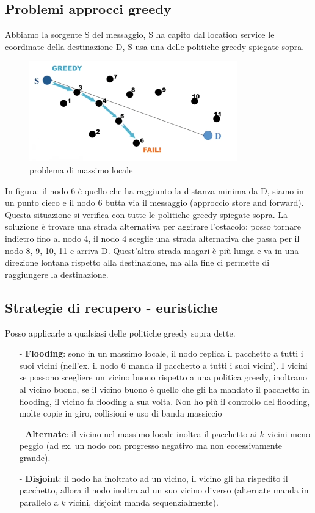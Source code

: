 \documentclass[12pt,italian]{report}
\begin{document}
\subsection{Problemi approcci greedy}
Abbiamo la sorgente S del messaggio, S ha capito dal location service le coordinate della destinazione D, S usa una delle politiche greedy spiegate sopra. 
\begin{figure}[h]
\centering
\includegraphics[width=90mm]{img/probgreed.PNG}
\caption{problema di massimo locale}
\label{fig:ferger}
\end{figure}

\noindent In figura: il nodo 6 è quello che ha raggiunto la distanza minima da D, siamo in un punto cieco e il nodo 6 butta via il messaggio (approccio store and forward). \\ Questa situazione si verifica con tutte le politiche greedy spiegate sopra. 
\bigbreak
La soluzione è trovare una strada alternativa per aggirare l'ostacolo: posso tornare indietro fino al nodo 4, il nodo 4 sceglie una strada alternativa che passa per il nodo 8, 9, 10, 11 e arriva D. Quest'altra strada magari è più lunga e va in una direzione lontana rispetto alla destinazione, ma alla fine ci permette di raggiungere la destinazione. 

\subsection{Strategie di recupero - euristiche}
Posso applicarle a qualsiasi delle politiche greedy sopra dette.
\begin{itemize}
    \item [-] \textbf{Flooding}: sono in un massimo locale, il nodo replica il pacchetto a tutti i suoi vicini (nell'ex. il nodo 6 manda il pacchetto a tutti i suoi vicini). I vicini se possono scegliere un vicino buono rispetto a una politica greedy, inoltrano al vicino buono, se il vicino buono è quello che gli ha mandato il pacchetto in flooding, il vicino fa flooding a sua volta.
    \bigbreak
    Non ho più il controllo del flooding, molte copie in giro, collisioni e uso di banda massiccio
    \item [-] \textbf{Alternate}: il vicino nel massimo locale inoltra il pacchetto ai $k$ vicini meno peggio (ad ex. un nodo con progresso negativo ma non eccessivamente grande). 
    \item [-] \textbf{Disjoint}: il nodo ha inoltrato ad un vicino, il vicino gli ha rispedito il pacchetto, allora il nodo inoltra ad un suo vicino diverso (alternate manda in parallelo a $k$ vicini, disjoint manda sequenzialmente).
\end{itemize}
\end{document}
